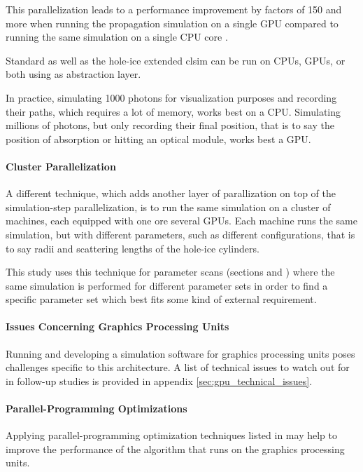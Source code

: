 This parallelization leads to a performance improvement by factors of 150 and more when running the propagation simulation on a single GPU compared to running the same simulation on a single CPU core \cite{ppcpaper}.

Standard  as well as the hole-ice extended clsim can be run on CPUs, GPUs, or both using  as abstraction layer.

In practice, simulating 1000 photons for visualization purposes and recording their paths, which requires a lot of memory, works best on a CPU. Simulating millions of photons, but only recording their final position, that is to say the position of absorption or hitting an optical module, works best a GPU.


\paragraph{Cluster Parallelization}
\label{sec:cluster_parallelization}
A different technique, which adds another layer of parallization on top of the simulation-step parallelization, is to run the same simulation on a cluster of machines, each equipped with one ore several GPUs. Each machine runs the same simulation, but with different parameters, such as different configurations, that is to say radii and scattering lengths of the hole-ice cylinders.

This study uses this technique for parameter scans (sections  and ) where the same simulation is performed for different parameter sets in order to find a specific parameter set which best fits some kind of external requirement.


\paragraph{Issues Concerning Graphics Processing Units}
Running and developing a simulation software for graphics processing units poses challenges specific to this architecture. A list of technical issues to watch out for in follow-up studies is provided in appendix \ref{sec:gpu_technical_issues}.


\paragraph{Parallel-Programming Optimizations}
Applying parallel-programming optimization techniques listed in  may help to improve the performance of the algorithm that runs on the graphics processing units.

